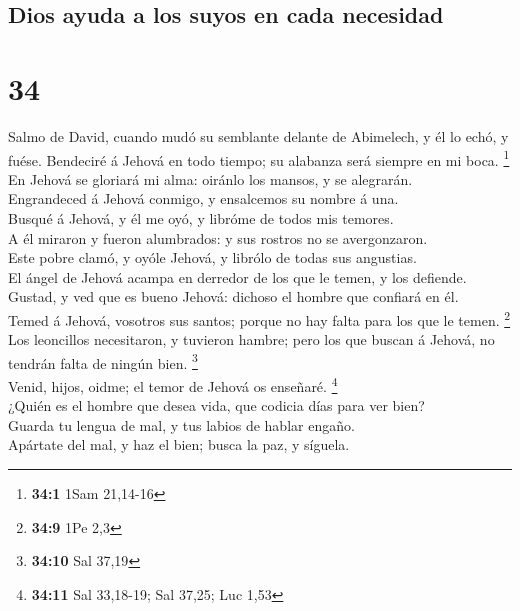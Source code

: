 \hypertarget{dios-ayuda-a-los-suyos-en-cada-necesidad}{%
\subsection{Dios ayuda a los suyos en cada
necesidad}\label{dios-ayuda-a-los-suyos-en-cada-necesidad}}

\hypertarget{section-33}{%
\section{34}\label{section-33}}

 Salmo de David, cuando mudó su semblante delante de
Abimelech, y él lo echó, y fuése. Bendeciré á Jehová en todo tiempo; su
alabanza será siempre en mi boca. \footnote{\textbf{34:1} 1Sam 21,14-16}\\
 En Jehová se gloriará mi alma: oiránlo los mansos, y se
alegrarán.\\
 Engrandeced á Jehová conmigo, y ensalcemos su nombre á
una.\\
 Busqué á Jehová, y él me oyó, y libróme de todos mis
temores.\\
 A él miraron y fueron alumbrados: y sus rostros no se
avergonzaron.\\
 Este pobre clamó, y oyóle Jehová, y librólo de todas sus
angustias.\\
 El ángel de Jehová acampa en derredor de los que le temen,
y los defiende.\\
 Gustad, y ved que es bueno Jehová: dichoso el hombre que
confiará en él.\\
 Temed á Jehová, vosotros sus santos; porque no hay falta
para los que le temen. \footnote{\textbf{34:9} 1Pe 2,3}\\
 Los leoncillos necesitaron, y tuvieron hambre; pero los
que buscan á Jehová, no tendrán falta de ningún bien. \footnote{\textbf{34:10}
  Sal 37,19}\\
 Venid, hijos, oidme; el temor de Jehová os enseñaré.
\footnote{\textbf{34:11} Sal 33,18-19; Sal 37,25; Luc 1,53}\\
 ¿Quién es el hombre que desea vida, que codicia días para
ver bien?\\
 Guarda tu lengua de mal, y tus labios de hablar engaño.\\
 Apártate del mal, y haz el bien; busca la paz, y
síguela.\\
